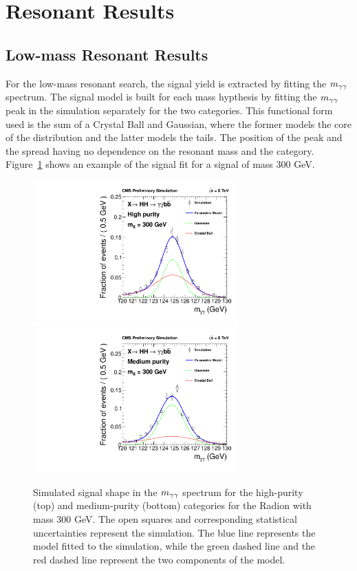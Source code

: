 \section{Resonant Results\label{sec:resresults}}

\subsection{Low-mass Resonant Results}

For the low-mass resonant search, the signal yield is extracted by fitting the $m_{\gamma\gamma}$ spectrum.
The signal model is built for each mass hypthesis by fitting the $m_{\gamma\gamma}$ peak in the simulation
separately for the two categories. This functional form used is the sum of a Crystal Ball and
Gaussian, where the former models the core of the distribution and the latter models the
tails. The position of the peak and the spread having no dependence on the resonant mass and the
category. Figure~\ref{fig:sigfit_300} shows an example of the signal fit for a signal of mass 300 GeV.

\begin{figure}[ht]
 \begin{center}
   \includegraphics[width=0.70\textwidth]{figures/results/sigmodel_cat0_300.pdf}
   \includegraphics[width=0.70\textwidth]{figures/results/sigmodel_cat1_300.pdf}
 \end{center}
\caption{Simulated signal shape in the $m_{\gamma\gamma}$ spectrum for the high-purity (top) and medium-purity
(bottom) categories for the Radion with mass 300 GeV. The open squares and corresponding
statistical uncertainties represent the simulation.
The blue line represents the model fitted to the simulation, while the green dashed line
and the red dashed line represent the two components of the model.}
\label{fig:sigfit_300}
\end{figure}

